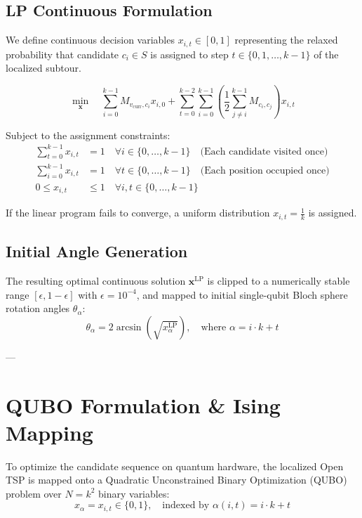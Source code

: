 \documentclass[11pt,a4paper]{article}
\begin{document}
\subsection{LP Continuous Formulation}
We define continuous decision variables $x_{i,t} \in [0, 1]$ representing the relaxed probability that candidate $c_i \in S$ is assigned to step $t \in \{0, 1, \dots, k-1\}$ of the localized subtour.

\begin{equation}
\min_{\mathbf{x}} \quad \sum_{i=0}^{k-1} M_{v_{\text{curr}}, c_i} x_{i,0} + \sum_{t=0}^{k-2} \sum_{i=0}^{k-1} \left( \frac{1}{2} \sum_{j \neq i}^{k-1} M_{c_i, c_j} \right) x_{i,t}
\end{equation}

Subject to the assignment constraints:
\begin{align}
\sum_{t=0}^{k-1} x_{i,t} &= 1 \quad \forall i \in \{0, \dots, k-1\} \quad \text{(Each candidate visited once)} \\
\sum_{i=0}^{k-1} x_{i,t} &= 1 \quad \forall t \in \{0, \dots, k-1\} \quad \text{(Each position occupied once)} \\
0 \le x_{i,t} &\le 1 \quad \forall i, t \in \{0, \dots, k-1\}
\end{align}

If the linear program fails to converge, a uniform distribution $x_{i,t} = \frac{1}{k}$ is assigned.

\subsection{Initial Angle Generation}
The resulting optimal continuous solution $\mathbf{x}^{\text{LP}}$ is clipped to a numerically stable range $[\epsilon, 1-\epsilon]$ with $\epsilon = 10^{-4}$, and mapped to initial single-qubit Bloch sphere rotation angles $\theta_{\alpha}$:
\begin{equation}
\theta_{\alpha} = 2 \arcsin\left(\sqrt{x^{\text{LP}}_{\alpha}}\right), \quad \text{where } \alpha = i \cdot k + t
\end{equation}

---

\section{QUBO Formulation \& Ising Mapping}

To optimize the candidate sequence on quantum hardware, the localized Open TSP is mapped onto a Quadratic Unconstrained Binary Optimization (QUBO) problem over $N = k^2$ binary variables:
\begin{equation}
x_{\alpha} = x_{i,t} \in \{0, 1\}, \quad \text{indexed by } \alpha(i,t) = i \cdot k + t
\end{equation}
\end{document}
